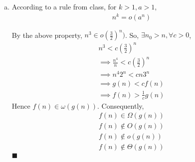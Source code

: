 \documentclass[12pt]{article}
\begin{document}
\begin{enumerate}[a.]
\item
{\bf

\begin{property}
According to a rule from class, for $k>1,a>1$,
\begin{gather*}
n^k = o (a^n)
\end{gather*}
\end{property}

By the above property, $n^3 \in o(\frac{3}{2})^n)$.
So, $\exists n_0>n, \forall c > 0$,
\begin{gather*}
n^3 < c (\frac{3}{2})^n\\
\implies \frac{n^4}{n} < c (\frac{3}{2})^n\\
\implies n^4 2^n < c n 3^n\\
\implies g(n) < cf(n)\\
\implies f(n) > \frac{1}{c}g(n)
\end{gather*}
Hence $f(n) \in \omega(g(n))$. Consequently,
\begin{gather*}
f(n) \in \Omega(g(n))\\
f(n) \notin O(g(n))\\
f(n) \notin o(g(n))\\
f(n) \notin \Theta(g(n))
\end{gather*}
\hfill $\blacksquare$
}

\end{enumerate}
\end{document}
